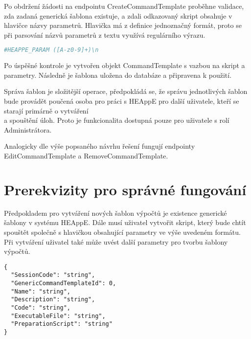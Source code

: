 Po obdržení žádosti na endpointu CreateCommandTemplate proběhne validace, zda zadaná generická šablona existuje, a zdali odkazovaný skript obsahuje v hlavičce názvy parametrů. Hlavička má z definice jednoznačný formát, proto se při parsování názvů parametrů z textu využívá regulárního výrazu.


\begin{lstlisting}[language=bash, caption={Regurální výraz pro parsování názvů parametrů}]
                                #HEAPPE_PARAM ([A-z0-9]+)\n
\end{lstlisting}

Po úspěšné kontrole je vytvořen objekt CommandTemplate s vazbou na skript a parametry. Následně je šablona uložena do databáze a připravena k použití.

Správa šablon je složitější operace, předpokládá se, že správu jednotlivých šablon bude provádět poučená osoba pro práci s HEAppE pro další uživatele, kteří se starají primárně o vytváření \\a spouštění úloh. Proto je funkcionalita dostupná pouze pro uživatele s rolí Administrátora.

Analogicky dle výše popsaného návrhu řešení fungují endpointy EditCommandTemplate a RemoveCommandTemplate.

\section{Prerekvizity pro správné fungování}
Předpokladem pro vytváření nových šablon výpočtů je existence generické šablony v systému HEAppE. Dále musí uživatel vytvořit skript, který bude chtít spouštět společně s hlavičkou obsahující parametry ve výše uvedeném formátu. Při vytváření uživatel také může uvést další parametry pro tvorbu šablony výpočtů.



\begin{lstlisting}[caption={JSON struktura pro endpoint CreateCommandTemplate}]
{
  "SessionCode": "string",
  "GenericCommandTemplateId": 0,
  "Name": "string",
  "Description": "string",
  "Code": "string",
  "ExecutableFile": "string",
  "PreparationScript": "string"
} 
\end{lstlisting}



